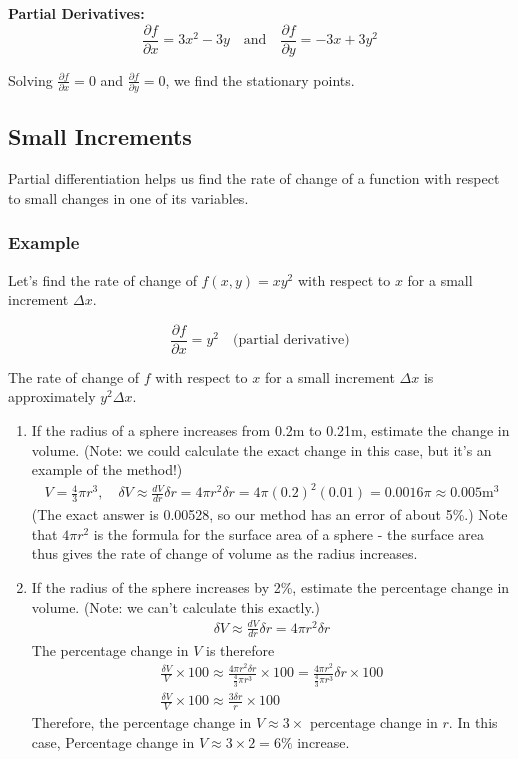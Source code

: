 \documentclass[a4paper,12pt]{article}
\begin{document}
\textbf{Partial Derivatives:}
\[
\frac{\partial f}{\partial x} = 3x^2 - 3y \quad \text{and} \quad \frac{\partial f}{\partial y} = -3x + 3y^2
\]

Solving \( \frac{\partial f}{\partial x} = 0 \) and \( \frac{\partial f}{\partial y} = 0 \), we find the stationary points.

\subsection*{Small Increments}

Partial differentiation helps us find the rate of change of a function with respect to small changes in one of its variables.

\subsubsection*{Example}

Let's find the rate of change of \( f(x, y) = xy^2 \) with respect to \( x \) for a small increment \( \Delta x \).

\[
\frac{\partial f}{\partial x} = y^2 \quad \text{(partial derivative)}
\]

The rate of change of \( f \) with respect to \( x \) for a small increment \( \Delta x \) is approximately \( y^2 \Delta x \).
\begin{enumerate}
   \item If the radius of a sphere increases from 0.2m to 0.21m, estimate the change in volume. (Note: we could calculate the exact change in this case, but it's an example of the method!)
   \begin{align*}
       V = \frac{4}{3}\pi r^3, \quad \delta V \approx \frac{dV}{dr}\delta r = 4\pi r^2\delta r = 4\pi(0.2)^2(0.01) = 0.0016\pi \approx 0.005\text{m}^3
   \end{align*}
   (The exact answer is 0.00528, so our method has an error of about 5\%.) Note that $4\pi r^2$ is the formula for the surface area of a sphere - the surface area thus gives the rate of change of volume as the radius increases.
   
   \item If the radius of the sphere increases by 2\%, estimate the percentage change in volume. (Note: we can't calculate this exactly.)
   \begin{align*}
       \delta V \approx \frac{dV}{dr}\delta r = 4\pi r^2\delta r
   \end{align*}
   The percentage change in $V$ is therefore
   \begin{align*}
       \frac{\delta V}{V} \times 100 \approx \frac{4\pi r^2\delta r}{\frac{4}{3}\pi r^3} \times 100 = \frac{4\pi r^2}{\frac{4}{3}\pi r^3}\delta r \times 100 \\
       \frac{\delta V}{V} \times 100 \approx \frac{3\delta r}{r} \times 100
   \end{align*}
   Therefore, the percentage change in $V \approx 3\times$ percentage change in $r$. In this case, Percentage change in $V \approx 3 \times 2 = 6\%$ increase.
\end{enumerate}


\vfill
\end{document}
